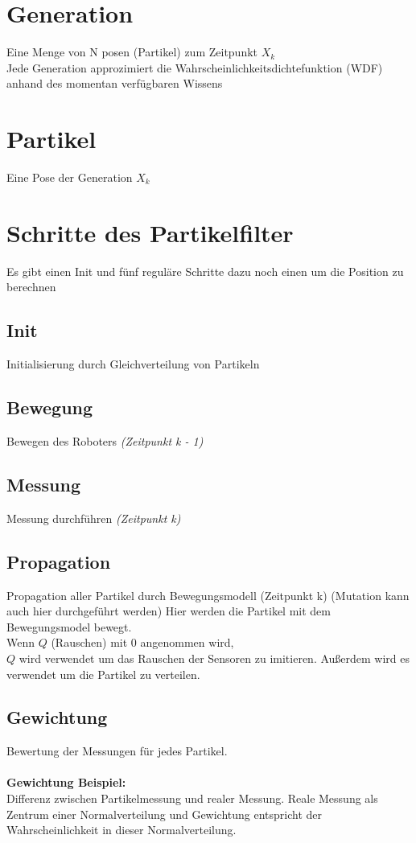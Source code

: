 	\section{Generation}
		Eine Menge von N posen (Partikel) zum Zeitpunkt $X_k$ \\
		Jede Generation approzimiert die Wahrscheinlichkeitsdichtefunktion (WDF) anhand des momentan verfügbaren Wissens

	\section{Partikel}
		Eine Pose der Generation $X_k$
		
	\section{Schritte des Partikelfilter}

		Es gibt einen Init und fünf reguläre Schritte dazu noch einen um die Position zu berechnen
		
		\subsection{Init}
		Initialisierung durch Gleichverteilung von Partikeln
		
		\subsection{Bewegung}
		Bewegen des Roboters \textit{(Zeitpunkt k - 1)}
		
		\subsection{Messung}
		Messung durchführen \textit{(Zeitpunkt k)}
		
		\subsection{Propagation}
		Propagation aller Partikel durch Bewegungsmodell (Zeitpunkt k) (Mutation kann auch hier durchgeführt werden)
		Hier werden die Partikel mit dem Bewegungsmodel bewegt. \\
		Wenn $Q$ (Rauschen) mit 0 angenommen wird, \\
		$Q$ wird verwendet um das Rauschen der Sensoren zu imitieren. Außerdem wird es verwendet um die Partikel zu verteilen.
		
		\subsection{Gewichtung}
		Bewertung der Messungen für jedes Partikel. \\
		\\
		\textbf{Gewichtung Beispiel:} \\
		Differenz zwischen Partikelmessung und realer Messung. Reale Messung als Zentrum einer Normalverteilung und Gewichtung entspricht der Wahrscheinlichkeit in dieser Normalverteilung.
		
